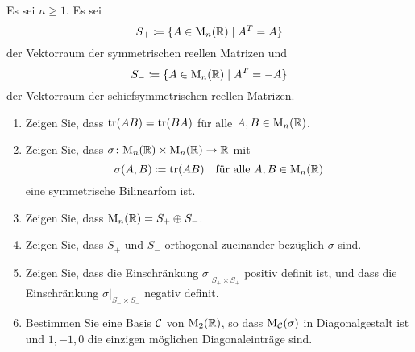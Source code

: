 \documentclass[a4paper, 10pt]{scrartcl}
\begin{document}
\begin{question}
  Es sei $n \geq 1$.
  Es sei
  \[
    S_+ \coloneqq \{A \in \mathrm{M}_n(\mathbb{R}) \mid A^T = A\}
  \]
  der Vektorraum der symmetrischen reellen Matrizen und
  \[
    S_- \coloneqq \{A \in \mathrm{M}_n(\mathbb{R}) \mid A^T = -A\}
  \]
  der Vektorraum der schiefsymmetrischen reellen Matrizen.
  \begin{enumerate}[leftmargin=*]
    \item
      Zeigen Sie, dass $\operatorname{tr}(AB) = \operatorname{tr}(BA)$ für alle $A, B \in \mathrm{M}_n(\mathbb{R})$.
    \item
      Zeigen Sie, dass $\sigma \colon \mathrm{M}_n(\mathbb{R}) \times \mathrm{M}_n(\mathbb{R}) \to \mathbb{R}$ mit
      \[
        \sigma(A,B) \coloneqq \operatorname{tr}(AB)
        \quad
        \text{für alle $A, B \in \mathrm{M}_n(\mathbb{R})$}
      \]
      eine symmetrische Bilinearfom ist.
    \item
      Zeigen Sie, dass $\mathrm{M}_n(\mathbb{R}) = S_+ \oplus S_-$.
    \item
      Zeigen Sie, dass $S_+$ und $S_-$ orthogonal zueinander bezüglich $\sigma$ sind.
    \item
      Zeigen Sie, dass die Einschränkung $\sigma|_{S_+ \times S_+}$ positiv definit ist, und dass die Einschränkung $\sigma|_{S_- \times S_-}$ negativ definit.
    \item
      Bestimmen Sie eine Basis $\mathcal{C}$ von $\mathrm{M}_2(\mathbb{R})$, so dass $\mathrm{M}_{\mathcal{C}}(\sigma)$ in Diagonalgestalt ist und $1, -1, 0$ die einzigen möglichen Diagonaleinträge sind.
  \end{enumerate}
\end{question}
\end{document}

